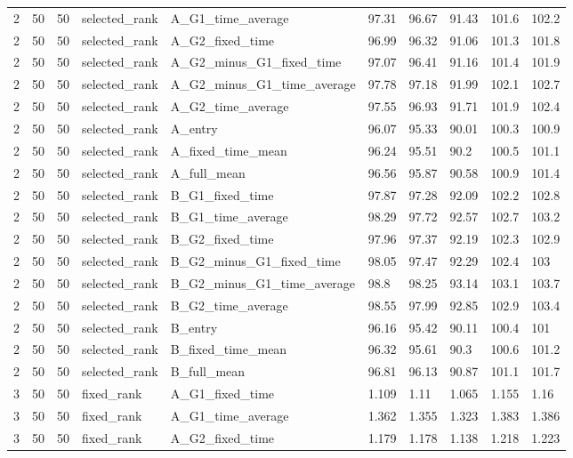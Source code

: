\begin{longtable}{llllllllll}
2 & 50 & 50 & selected\_rank & A\_G1\_time\_average & 97.31 & 96.67 & 91.43 & 101.6 & 102.2 \\
2 & 50 & 50 & selected\_rank & A\_G2\_fixed\_time & 96.99 & 96.32 & 91.06 & 101.3 & 101.8 \\
2 & 50 & 50 & selected\_rank & A\_G2\_minus\_G1\_fixed\_time & 97.07 & 96.41 & 91.16 & 101.4 & 101.9 \\
2 & 50 & 50 & selected\_rank & A\_G2\_minus\_G1\_time\_average & 97.78 & 97.18 & 91.99 & 102.1 & 102.7 \\
2 & 50 & 50 & selected\_rank & A\_G2\_time\_average & 97.55 & 96.93 & 91.71 & 101.9 & 102.4 \\
2 & 50 & 50 & selected\_rank & A\_entry & 96.07 & 95.33 & 90.01 & 100.3 & 100.9 \\
2 & 50 & 50 & selected\_rank & A\_fixed\_time\_mean & 96.24 & 95.51 & 90.2 & 100.5 & 101.1 \\
2 & 50 & 50 & selected\_rank & A\_full\_mean & 96.56 & 95.87 & 90.58 & 100.9 & 101.4 \\
2 & 50 & 50 & selected\_rank & B\_G1\_fixed\_time & 97.87 & 97.28 & 92.09 & 102.2 & 102.8 \\
2 & 50 & 50 & selected\_rank & B\_G1\_time\_average & 98.29 & 97.72 & 92.57 & 102.7 & 103.2 \\
2 & 50 & 50 & selected\_rank & B\_G2\_fixed\_time & 97.96 & 97.37 & 92.19 & 102.3 & 102.9 \\
2 & 50 & 50 & selected\_rank & B\_G2\_minus\_G1\_fixed\_time & 98.05 & 97.47 & 92.29 & 102.4 & 103 \\
2 & 50 & 50 & selected\_rank & B\_G2\_minus\_G1\_time\_average & 98.8 & 98.25 & 93.14 & 103.1 & 103.7 \\
2 & 50 & 50 & selected\_rank & B\_G2\_time\_average & 98.55 & 97.99 & 92.85 & 102.9 & 103.4 \\
2 & 50 & 50 & selected\_rank & B\_entry & 96.16 & 95.42 & 90.11 & 100.4 & 101 \\
2 & 50 & 50 & selected\_rank & B\_fixed\_time\_mean & 96.32 & 95.61 & 90.3 & 100.6 & 101.2 \\
2 & 50 & 50 & selected\_rank & B\_full\_mean & 96.81 & 96.13 & 90.87 & 101.1 & 101.7 \\
3 & 50 & 50 & fixed\_rank & A\_G1\_fixed\_time & 1.109 & 1.11 & 1.065 & 1.155 & 1.16 \\
3 & 50 & 50 & fixed\_rank & A\_G1\_time\_average & 1.362 & 1.355 & 1.323 & 1.383 & 1.386 \\
3 & 50 & 50 & fixed\_rank & A\_G2\_fixed\_time & 1.179 & 1.178 & 1.138 & 1.218 & 1.223 \\

\end{longtable}
